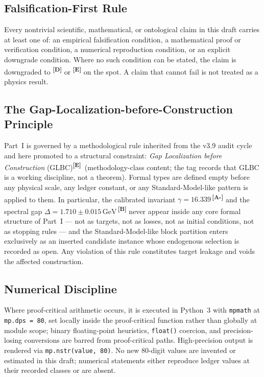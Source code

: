 \documentclass[12pt,a4paper,twoside]{article}
\theoremstyle{plain}
\theoremstyle{definition}
\theoremstyle{remark}
\newcommand{\GeV}{\,\mathrm{GeV}}
\newcommand{\catmark}[1]{\textsuperscript{\textsf{\textbf{[#1]}}}}
\newcommand{\DeltaGap}{1.710 \pm 0.015\GeV} %
\newcommand{\GammaGeom}{16.339} %
\begin{document}
\subsection{Falsification-First Rule}
\label{subsec:falsification-first}

Every nontrivial scientific, mathematical, or ontological claim in this
draft carries at least one of: an empirical falsification condition, a
mathematical proof or verification condition, a numerical reproduction
condition, or an explicit downgrade condition. Where no such condition can
be stated, the claim is downgraded to \catmark{D} or \catmark{E} on the
spot. A claim that cannot fail is not treated as a physics result.

\subsection{The Gap-Localization-before-Construction Principle}
\label{subsec:glbc}

Part~I is governed by a methodological rule inherited from the v3.9 audit
cycle and here promoted to a structural constraint: \emph{Gap Localization
before Construction} (GLBC)\catmark{E}\ (methodology-class content; the
tag records that GLBC is a working discipline, not a theorem). Formal
types are defined empty before any physical scale, any ledger constant, or
any Standard-Model-like pattern is applied to them. In particular, the
calibrated invariant $\gamma = \GammaGeom$\,\catmark{A-} and the spectral
gap $\Delta = \DeltaGap$\,\catmark{B} never appear inside any core formal
structure of Part~I --- not as targets, not as losses, not as initial
conditions, not as stopping rules --- and the Standard-Model-like block
partition enters exclusively as an inserted candidate instance whose
endogenous selection is recorded as open. Any violation of this rule
constitutes target leakage and voids the affected construction.

\subsection{Numerical Discipline}
\label{subsec:numerical-discipline}

Where proof-critical arithmetic occurs, it is executed in Python~3 with
\texttt{mpmath} at \texttt{mp.dps = 80}, set locally inside the
proof-critical function rather than globally at module scope; binary
floating-point heuristics, \texttt{float()} coercion, and precision-losing
conversions are barred from proof-critical paths. High-precision output is
rendered via \texttt{mp.nstr(value, 80)}. No new 80-digit values are
invented or estimated in this draft; numerical statements either reproduce
ledger values at their recorded classes or are absent.
\end{document}
